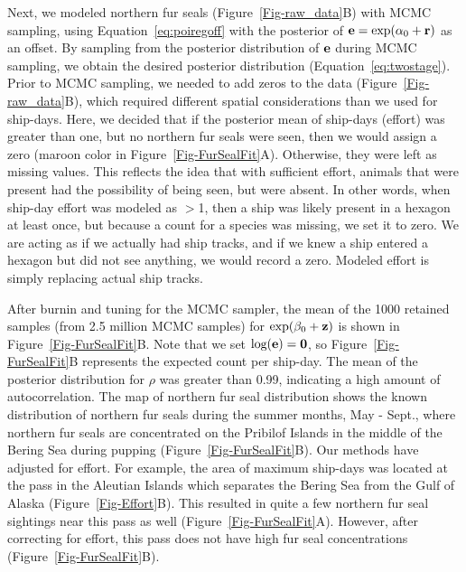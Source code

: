 \documentclass[11pt, titlepage]{article}
\begin{document}
\begin{spacing}{1.9}
\begin{flushleft}
Next, we modeled northern fur seals (Figure~\ref{Fig-raw_data}B) with MCMC sampling, using Equation~\eqref{eq:poiregoff} with the posterior of $\mathbf{e} = \exp(\alpha_{0} + \mathbf{r})$ as an offset. By sampling from the posterior distribution of $\mathbf{e}$ during MCMC sampling, we obtain the desired posterior distribution (Equation~\ref{eq:twostage}). Prior to MCMC sampling, we needed to add zeros to the data (Figure~\ref{Fig-raw_data}B), which required different spatial considerations than we used for ship-days. Here, we decided that if the posterior mean of ship-days (effort) was greater than one, but no northern fur seals were seen, then we would assign a zero (maroon color in Figure~\ref{Fig-FurSealFit}A). Otherwise, they were left as missing values.  This reflects the idea that with sufficient effort, animals that were present had the possibility of being seen, but were absent. In other words, when ship-day effort was modeled as $>$1, then a ship was likely present in a hexagon at least once, but because a count for a species was missing, we set it to zero. We are acting as if we actually had ship tracks, and if we knew a ship entered a hexagon but did not see anything, we would record a zero. Modeled effort is simply replacing actual ship tracks.
 
After burnin and tuning for the MCMC sampler, the mean of the 1000 retained samples (from 2.5 million MCMC samples) for $\exp(\beta_{0} + \mathbf{z})$ is shown in Figure~\ref{Fig-FurSealFit}B.  Note that we set $\textrm{log}(\mathbf{e}) = \mathbf{0}$, so Figure~\ref{Fig-FurSealFit}B represents the expected count per ship-day. The mean of the posterior distribution for $\rho$ was greater than 0.99, indicating a high amount of autocorrelation.  The map of northern fur seal distribution shows the known distribution of northern fur seals during the summer months, May - Sept., where northern fur seals are concentrated on the Pribilof Islands in the middle of the Bering Sea during pupping (Figure~\ref{Fig-FurSealFit}B).  Our methods have adjusted for effort. For example, the area of maximum ship-days was located at the pass in the Aleutian Islands which separates the Bering Sea from the Gulf of Alaska (Figure~\ref{Fig-Effort}B).  This resulted in quite a few northern fur seal sightings near this pass as well (Figure~\ref{Fig-FurSealFit}A).  However, after correcting for effort, this pass does not have high fur seal concentrations (Figure~\ref{Fig-FurSealFit}B).


\end{flushleft}
\end{spacing}
\end{document}

